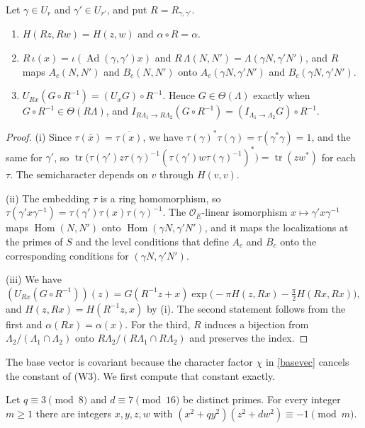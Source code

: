 \begin{lemma}\label{transport}
Let $\gamma\in U_r$ and $\gamma'\in U_{r'}$, and put $R=R_{\gamma,\gamma'}$.
\begin{enumerate}
\item[(i)] $H(Rz,Rw)=H(z,w)$ and $\alpha\circ R=\alpha$.
\item[(ii)] $R\,\iota(x)=\iota(\operatorname{Ad}(\gamma,\gamma')x)$ and $R\,\Lambda(N,N')=\Lambda(\gamma N,\gamma'N')$, and $R$ maps $A_c(N,N')$ and $B_c(N,N')$ onto $A_c(\gamma N,\gamma'N')$ and $B_c(\gamma N,\gamma'N')$.
\item[(iii)] $U_{Rx}(G\circ R^{-1})=(U_xG)\circ R^{-1}$. Hence $G\in\Theta(\Lambda)$ exactly when $G\circ R^{-1}\in\Theta(R\Lambda)$, and $I_{R\Lambda_1\to R\Lambda_2}(G\circ R^{-1})=(I_{\Lambda_1\to\Lambda_2}G)\circ R^{-1}$.
\end{enumerate}
\end{lemma}

\begin{proof}
(i) Since $\tau(\bar x)=\overline{\tau(x)}$, we have $\tau(\gamma)^\ast\tau(\gamma)=\tau(\gamma^\ast\gamma)=1$, and the same for $\gamma'$, so $\operatorname{tr}\big(\tau(\gamma')z\tau(\gamma)^{-1}(\tau(\gamma')w\tau(\gamma)^{-1})^\ast\big)=\operatorname{tr}(zw^\ast)$ for each $\tau$. The semicharacter depends on $v$ through $H(v,v)$.

(ii) The embedding $\tau$ is a ring homomorphism, so $\tau(\gamma'x\gamma^{-1})=\tau(\gamma')\tau(x)\tau(\gamma)^{-1}$. The $\mathcal O_E$-linear isomorphism $x\mapsto\gamma'x\gamma^{-1}$ maps $\operatorname{Hom}(N,N')$ onto $\operatorname{Hom}(\gamma N,\gamma'N')$, and it maps the localizations at the primes of $S$ and the level conditions that define $A_c$ and $B_c$ onto the corresponding conditions for $(\gamma N,\gamma'N')$.

(iii) We have $(U_{Rx}(G\circ R^{-1}))(z)=G(R^{-1}z+x)\exp\big(-\pi H(z,Rx)-\frac\pi2H(Rx,Rx)\big)$, and $H(z,Rx)=H(R^{-1}z,x)$ by (i). The second statement follows from the first and $\alpha(Rx)=\alpha(x)$. For the third, $R$ induces a bijection from $\Lambda_2/(\Lambda_1\cap\Lambda_2)$ onto $R\Lambda_2/(R\Lambda_1\cap R\Lambda_2)$ and preserves the index.
\end{proof}

The base vector is covariant because the character factor $\chi$ in \eqref{basevec} cancels the constant of (W3). We first compute that constant exactly.

\begin{lemma}\label{normcong}
Let $q\equiv3\pmod8$ and $d\equiv7\pmod{16}$ be distinct primes. For every integer $m\ge1$ there are integers $x,y,z,w$ with $(x^2+qy^2)(z^2+dw^2)\equiv-1\pmod m$.
\end{lemma}


